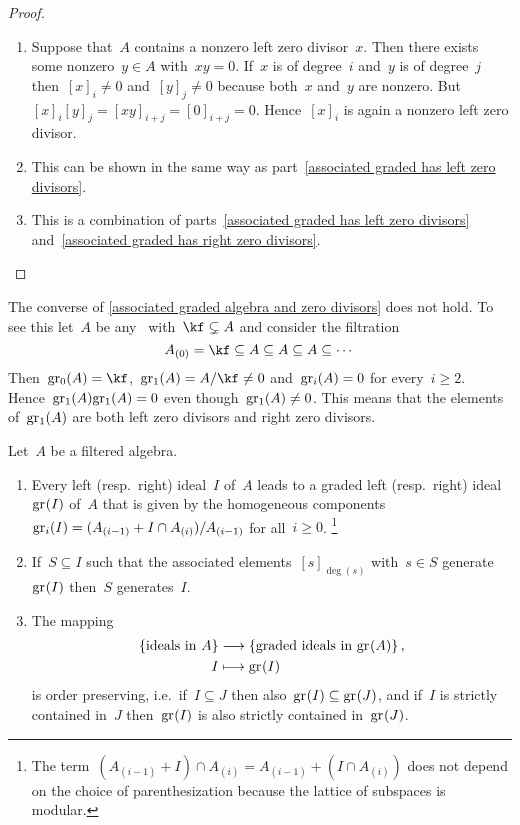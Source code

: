 \begin{proof}
  \leavevmode
  \begin{enumerate}
    \item
      Suppose that~$A$ contains a nonzero left zero divisor~$x$.
      Then there exists some nonzero~$y \in A$ with~$xy = 0$.
      If~$x$ is of degree~$i$ and~$y$ is of degree~$j$ then~$[x]_i \neq 0$ and~$[y]_j \neq 0$ because both~$x$ and~$y$ are nonzero.
      But~$[x]_i [y]_j = [xy]_{i+j} = [0]_{i+j} = 0$.
      Hence~$[x]_i$ is again a nonzero left zero divisor.
    \item
      This can be shown in the same way as part~\ref*{associated graded has left zero divisors}.
    \item
      This is a combination of parts~\ref*{associated graded has left zero divisors} and~\ref*{associated graded has right zero divisors}.
    \qedhere
  \end{enumerate}
\end{proof}


\begin{remark}
  The converse of \cref{associated graded algebra and zero divisors} does not hold.
  To see this let~$A$ be any~\algebra{$\kf$} with~$\kf \subsetneq A$ and consider the filtration
  \[
    A_{(0)}
    =
    \kf
    \subseteq
    A
    \subseteq
    A
    \subseteq
    A
    \subseteq
    \dotsb
  \]
  Then~$\gr[0](A) = \kf$,~$\gr[1](A) = A/{\kf} \neq 0$ and~$\gr[i](A) = 0$ for every~$i \geq 2$.
  Hence~$\gr[1](A) \gr[1](A) = 0$ even though~$\gr[1](A) \neq 0$.
  This means that the elements of~$\gr[1](A)$ are both left zero divisors and right zero divisors.
\end{remark}


\begin{proposition}
  \label{associated graded ideals}
  Let~$A$ be a filtered algebra. 
  \begin{enumerate}
    \item
      Every left (resp.\ right) ideal~$I$ of~$A$ leads to a graded left (resp.\ right) ideal~$\gr(I)$ of~$A$ that is given by the homogeneous components~$\gr[i](I) = (A_{(i-1)} + I \cap A_{(i)}) / A_{(i-1)}$ for all~$i \geq 0$.%
      \footnote{The term~$(A_{(i-1)} + I) \cap A_{(i)} = A_{(i-1)} + (I \cap A_{(i)})$ does not depend on the choice of parenthesization because the lattice of subspaces is modular.}
    \item
      \label{pulling back generating set from graded ideal}
      If~$S \subseteq I$ such that the associated elements~$[s]_{\deg(s)}$ with~$s \in S$ generate~$\gr(I)$ then~$S$ generates~$I$.
    \item
      The mapping
      \begin{align*}
        \{ \text{ideals in~$A$} \}
        &\to
        \{ \text{graded ideals in~$\gr(A)$} \}  \,,
        \\
        I
        &\mapsto
        \gr(I)
      \end{align*}
      is order preserving, i.e.\ if~$I \subseteq J$ then also~$\gr(I) \subseteq \gr(J)$, and if~$I$ is strictly contained in~$J$ then~$\gr(I)$ is also strictly contained in~$\gr(J)$.
  \end{enumerate}
\end{proposition}


